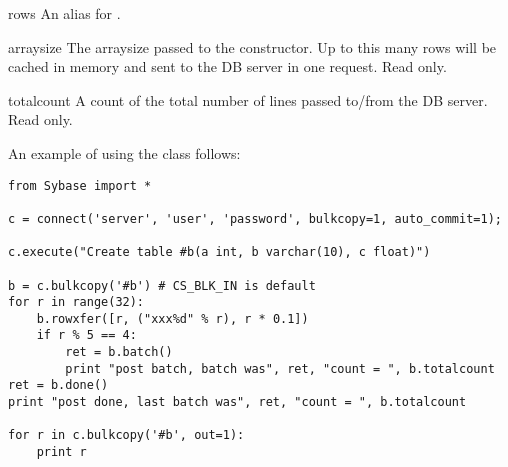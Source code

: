 \begin{methoddesc}[Bulkcopy]{rows}{}
An alias for .
\end{methoddesc}


\begin{methoddesc}[Bulkcopy]{arraysize}
The arraysize passed to the constructor.  Up to this many rows will be
cached in memory and sent to the DB server in one request. Read only.
\end{methoddesc}

\begin{methoddesc}[Bulkcopy]{totalcount}
A count of the total number of lines passed to/from the DB server.
Read only.
\end{methoddesc}

An example of using the  class follows:

\begin{verbatim}
from Sybase import *

c = connect('server', 'user', 'password', bulkcopy=1, auto_commit=1);

c.execute("Create table #b(a int, b varchar(10), c float)")

b = c.bulkcopy('#b') # CS_BLK_IN is default
for r in range(32):
    b.rowxfer([r, ("xxx%d" % r), r * 0.1])
    if r % 5 == 4:
        ret = b.batch()
        print "post batch, batch was", ret, "count = ", b.totalcount
ret = b.done()
print "post done, last batch was", ret, "count = ", b.totalcount

for r in c.bulkcopy('#b', out=1):
    print r
\end{verbatim}
